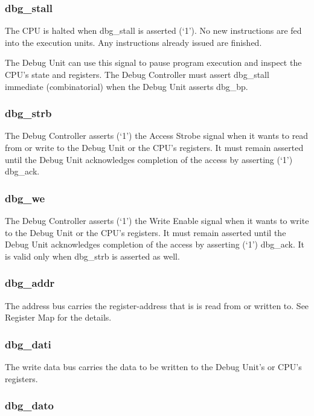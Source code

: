 \subsubsection{dbg\_stall}\label{dbg_stall}

The CPU is halted when dbg\_stall is asserted (`1'). No new instructions
are fed into the execution units. Any instructions already issued are
finished.

The Debug Unit can use this signal to pause program execution and
inspect the CPU's state and registers. The Debug Controller must assert
dbg\_stall immediate (combinatorial) when the Debug Unit asserts
dbg\_bp.

\subsubsection{dbg\_strb}\label{dbg_strb}

The Debug Controller asserts (`1') the Access Strobe signal when it
wants to read from or write to the Debug Unit or the CPU's registers. It
must remain asserted until the Debug Unit acknowledges completion of the
access by asserting (`1') dbg\_ack.

\subsubsection{dbg\_we}\label{dbg_we}

The Debug Controller asserts (`1') the Write Enable signal when it wants
to write to the Debug Unit or the CPU's registers. It must remain
asserted until the Debug Unit acknowledges completion of the access by
asserting (`1') dbg\_ack. It is valid only when dbg\_strb is asserted as
well.

\subsubsection{dbg\_addr}\label{dbg_addr}

The address bus carries the register-address that is is read from or
written to. See Register Map for the details.

\subsubsection{dbg\_dati}\label{dbg_dati}

The write data bus carries the data to be written to the Debug Unit's or
CPU's registers.

\subsubsection{dbg\_dato}\label{dbg_dato}

